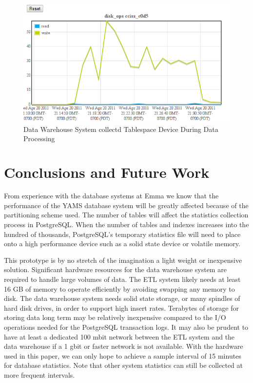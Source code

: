 \documentclass[twocolumn,letterpaper]{article}
\begin{document}
\begin{figure}[ht]
  \begin{center}
    \includegraphics[scale=0.37]{etl-c6-disk-c0d5-iops}
  \end{center}
  \caption{Data Warehouse System collectd Tablespace Device During Data
           Processing}
  \label{etl-c6-c0d5}
\end{figure}

\section{Conclusions and Future Work}

From experience with the database systems at Emma we know that the performance
of the YAMS database system will be greatly affected because of the
partitioning scheme used.  The number of tables will affect the statistics
collection process in PostgreSQL.  When the number of tables and indexes
increases into the hundred of thousands, PostgreSQL's temporary statistics file
will need to place onto a high performance device such as a solid state device
or volatile memory.

This prototype is by no stretch of the imagination a light weight or
inexpensive solution.  Significant hardware resources for the data warehouse
system are required to handle large volumes of data.  The ETL system likely
needs at least 16 GB of memory to operate efficiently by avoiding swapping any
memory to disk.  The data warehouse system needs solid state storage, or many
spindles of hard disk drives, in order to support high insert rates.  Terabytes
of storage for storing data long term may be relatively inexpensive compared to
the I/O operations needed for the PostgreSQL transaction logs.  It may also be
prudent to have at least a dedicated 100 mbit network between the ETL system
and the data warehouse if a 1 gbit or faster network is not available.  With
the hardware used in this paper, we can only hope to achieve a sample interval
of 15 minutes for database statistics.  Note that other system statistics can
still be collected at more frequent intervals.
\end{document}
